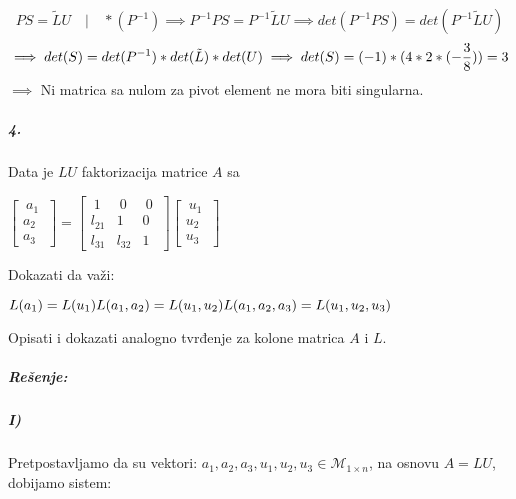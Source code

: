 \documentclass[11pt]{article}
\begin{document}
   \begin{equation*}
   PS=\tilde L U \quad | \quad *(P^{-1})\implies
   P^{-1}PS=P^{-1}\tilde L U\implies det(P^{-1}PS)=det(P^{-1}\tilde L U)
   \end{equation*}
   \begin{equation*}
   \implies det(S)=det(P^{-1})*det(\tilde  L)*det(U)\\
   \implies det(S)=(-1)*(4*2*(-\frac{\displaystyle3}{\displaystyle8}))=3
   \end{equation*}
   $\implies$ Ni matrica sa nulom za pivot element ne mora biti singularna.
\subparagraph*{4.}
{Data je $LU$ faktorizacija matrice $A$ sa
\begin{center}
$
\begin{bmatrix}
\ a_1\  \\
\hline
a_2\\
\hline
a_3
\end{bmatrix}
=
\begin{bmatrix}
\ 1 \ & \ 0\  & \ 0\ \\
\hline
l_{21} & 1 & 0\\
\hline
l_{31} & l_{32} & 1
\end{bmatrix}
\begin{bmatrix}
\ u_1\  \\
\hline
u_2\\
\hline
u_3
\end{bmatrix}
$
\end{center}
Dokazati da važi:
\begin{center}
$
L(a_1) = L(u_1)
\linebreak
L(a_1, a_2) = L(u_1, u_2)
\linebreak
L(a_1, a_2, a_3) = L(u_1, u_2, u_3)
$
\end{center}
Opisati i dokazati analogno tvrđenje za kolone matrica $A$ i $L$.}
\subparagraph*{Rešenje:}
\subparagraph*{I)}
Pretpostavljamo da su vektori: $a_1,a_2,a_3,u_1,u_2,u_3 \in \mathcal{M}_{1 \times n}$, na osnovu $A=LU$, dobijamo sistem:
\end{document}
